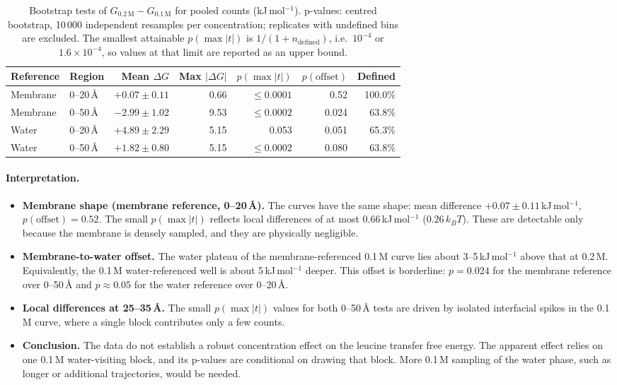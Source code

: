 \documentclass[11pt,a4paper]{article}
\newcommand{\kJ}{\,kJ\,mol$^{-1}$}
\begin{document}
\begin{table}[H]
\centering
\caption{Bootstrap tests of $G_{0.2\,\text{M}} - G_{0.1\,\text{M}}$ for pooled counts
(kJ\,mol$^{-1}$). p-values: centred bootstrap, 10\,000 independent resamples per
concentration; replicates with undefined bins are excluded. The smallest attainable
$p(\max|t|)$ is $1/(1+n_\text{defined})$, i.e.\ $10^{-4}$ or $1.6\times10^{-4}$, so values at
that limit are reported as an upper bound.}
\label{tab:pvalues}
\begin{tabular}{llrrrrr}
\toprule
Reference & Region & Mean $\Delta G$ & Max $|\Delta G|$ & $p(\max|t|)$ & $p(\text{offset})$ & Defined \\
\midrule
Membrane & 0--20\,\AA & $+0.07 \pm 0.11$ & 0.66 & $\le 0.0001$ & 0.52 & 100.0\% \\
Membrane & 0--50\,\AA & $-2.99 \pm 1.02$ & 9.53 & $\le 0.0002$ & 0.024 & 63.8\% \\
Water    & 0--20\,\AA & $+4.89 \pm 2.29$ & 5.15 & 0.053 & 0.051 & 65.3\% \\
Water    & 0--50\,\AA & $+1.82 \pm 0.80$ & 5.15 & $\le 0.0002$ & 0.080 & 63.8\% \\
\bottomrule
\end{tabular}
\end{table}

\paragraph{Interpretation.}
\begin{itemize}
  \item \textbf{Membrane shape (membrane reference, 0--20\,\AA).} The curves have the same
  shape: mean difference $+0.07\pm0.11$\kJ, $p(\text{offset}) = 0.52$. The small
  $p(\max|t|)$ reflects local differences of at most 0.66\kJ{} ($0.26\,k_BT$). These are
  detectable only because the membrane is densely sampled, and they are physically
  negligible.
  \item \textbf{Membrane-to-water offset.} The water plateau of the membrane-referenced 0.1\,M
  curve lies about 3--5\kJ{} above that at 0.2\,M. Equivalently, the 0.1\,M water-referenced
  well is about 5\kJ{} deeper. This offset is borderline: $p = 0.024$ for the membrane
  reference over 0--50\,\AA{} and $p \approx 0.05$ for the water reference over 0--20\,\AA.
  \item \textbf{Local differences at 25--35\,\AA.} The small $p(\max|t|)$ values for both
  0--50\,\AA{} tests are driven by isolated interfacial spikes in the 0.1\,M curve, where
  a single block contributes only a few counts.
  \item \textbf{Conclusion.} The data do not establish a robust concentration effect on
  the leucine transfer free energy. The apparent effect relies on one 0.1\,M water-visiting
  block, and its p-values are conditional on drawing that block. More 0.1\,M sampling of the
  water phase, such as longer or additional trajectories, would be needed.
\end{itemize}
\end{document}
